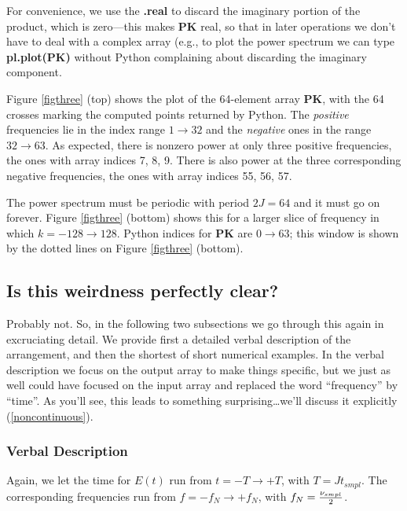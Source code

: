 \documentclass[11pt,preprint]{aastex}
\begin{document}
\noindent For convenience, we use the {\bf .real} to discard the
imaginary portion of the product, which is zero---this makes {\bf PK}
real, so that in later operations we don't have to deal with a complex
array (e.g., to plot the power spectrum we can type {\bf pl.plot(PK)} without 
Python complaining about discarding the imaginary component.

	Figure \ref{figthree} (top) shows the plot of the 64-element
array {\bf PK}, with the 64 crosses marking the computed points returned
by Python.  The {\it positive} frequencies lie in the index range $1
\rightarrow 32$ and the {\it negative} ones in the range $32 \rightarrow
63$.  As expected, there is nonzero power at only three positive
frequencies, the ones with array indices 7, 8, 9.  There is also power at
the three corresponding negative frequencies, the ones with array indices
55, 56, 57. 

	The power spectrum must be periodic with period $2J = 64$ and it
must go on forever.  Figure \ref{figthree} (bottom) shows this for a
larger slice of frequency in which $k = -128 \rightarrow 128$.  Python
indices for {\bf PK} are $0 \rightarrow 63$; this window is shown by the
dotted lines on Figure \ref{figthree} (bottom). 

\subsection{ Is this weirdness perfectly clear? }

\label{clear}

	Probably not.  So, in the following two subsections we go
through this again in excruciating detail.  We provide first a detailed
verbal description of the arrangement, and then the shortest of short
numerical examples.  In the verbal description we focus on the output
array to make things specific, but we just as well could have focused
on the input array and replaced the word ``frequency'' by ``time''.  As
you'll see, this leads to something surprising\dots we'll discuss it
explicitly (\ref{noncontinuous}).

\subsubsection{Verbal Description}

	Again, we let the time for $E(t)$ run from $t = -T \rightarrow
+T$, with $T = J t_{smpl}$.  The corresponding frequencies run from $f =
-f_N \rightarrow +f_N$, with $f_N = {\nu_{smpl} \over 2}$. 
\end{document}
